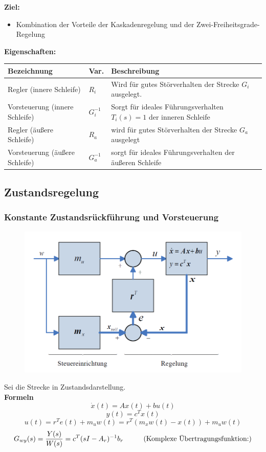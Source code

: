 \documentclass[10pt,a4paper]{article}
\newcommand{\tab}[1][1]{\hspace*{#1cm}}
\begin{document}
\textbf{Ziel:}
\begin{itemize}
	\item Kombination der Vorteile der Kaskadenregelung und der Zwei-Freiheitsgrade-Regelung
\end{itemize}

\textbf{Eigenschaften:} ~\\
\begin{tabularx}{\columnwidth}{llX}
	Bezeichnung & Var. & Beschreibung \\
	\hline
	Regler (innere Schleife) & $R_i$ & Wird für gutes Störverhalten der Strecke $G_i$ ausgelegt. \\
	Vorsteuerung (innere Schleife) & $G_i^{-1}$ & Sorgt für ideales Führungsverhalten $T_i(s) = 1$ der inneren Schleife \\
	Regler (äußere Schleife) & $R_a$ & wird für gutes Störverhalten der Strecke $G_a$ ausgelegt \\
	Vorsteuerung (äußere Schleife) & $G_a^{-1}$ & sorgt für ideales Führungsverhalten der äußeren Schleife \\
\end{tabularx}

\subsection{Zustandsregelung}
\subsubsection{Konstante Zustandsrückführung und Vorsteuerung}
\label{zustandsrueckfuehrung}
\begin{figure}[H]
	\includegraphics[width=0.7\columnwidth]{imgs/abb7_10.png}
\end{figure}

Sei die Strecke in Zustandsdarstellung. \\

\textbf{Formeln}
$$
	\dot x(t) = Ax(t) + bu(t)
$$
$$
	y(t) = c^Tx(t)
$$
$$
	u(t) = r^Te(t) + m_uw(t) = r^T(m_xw(t)-x(t)) + m_u w(t)
$$
$$
	G_{wy}(s) = \frac{Y(s)}{W(s)} = c^T(sI-A_r)^{-1}b_r \tab (\text{Komplexe Übertragungsfunktion:})
$$ ~\\
\end{document}

